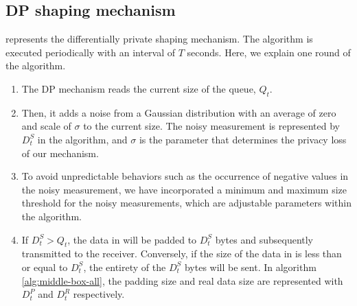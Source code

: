 \subsection{DP shaping mechanism}
\label{subsec:dp-shaping}

 

 represents the differentially private shaping
mechanism.  The algorithm is executed periodically with an interval of $T$
seconds.  Here, we explain one round of the algorithm.
\begin{enumerate}
  \item The DP mechanism reads the current size of the queue, $Q_t$.
  \item Then, it adds a noise from a Gaussian distribution with an average of
  zero and scale of ${\sigma}$ to the current size. The noisy measurement is
  represented by $D^S_t$ in the algorithm, and $\sigma$ is the parameter that
  determines the privacy loss of our mechanism.
  \item To avoid unpredictable behaviors such as the occurrence of negative
  values in the noisy measurement, we have incorporated a minimum and maximum
  size threshold for the noisy measurements, which are adjustable parameters
  within the algorithm.
  \item If $D^S_t > Q_t$, the data in {\unshapedQ} will be padded to $D^S_t$
  bytes and subsequently transmitted to the receiver.
  Conversely, if the size of the data in {\unshapedQ} is less than or equal to
  $D^S_t$, the entirety of the $D^S_t$ bytes will be sent.  In algorithm
  \ref{alg:middle-box-all}, the padding size and real data size are represented
  with $D^P_t$ and $D^R_t$ respectively.
\end{enumerate}
\fi

